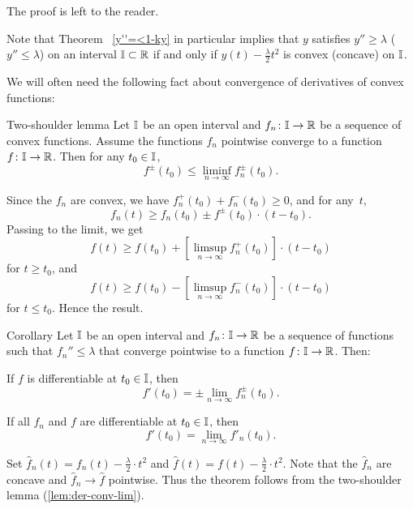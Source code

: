 The proof is left to the reader.


Note that Theorem ~\ref{y''=<1-ky} in particular implies that $y$ satisfies $y''\ge \lambda$ ( $y''\le \lambda$)  on an interval $\II\subset\RR$  if and only if $y(t)-\frac{\lambda}{2}t^2$ is convex (concave) on $\mathbb{I}$.

We will often need the following fact about convergence of derivatives of convex functions:

{\sloppy 

\begin{thm}{Two-shoulder lemma}\label{lem:der-conv-lim}
Let $\mathbb{I}$ be an open interval 
and $f_n\:\II\to\RR$ be a sequence of 
convex functions. 
Assume the functions $f_n$ pointwise converge to a function $f\:\II\to\RR$.
Then for any $t_0\in \II$,
\[f^\pm(t_0)\le \liminf_{n\to\infty}f^\pm_n(t_0).\]
\end{thm}

}

Since the $f_n$ are convex, we have $f^+_n(t_0)+f^-_n(t_0)\ge0$, and for any~$t$,
\[f_n(t)\ge f_n(t_0)\pm f^\pm(t_0)\cdot (t-t_0).\]
Passing to the limit, we get
\[f(t)\ge f(t_0)+\left[\limsup_{n\to\infty}f^+_n(t_0)\right]\cdot (t-t_0)\]
for $t\ge t_0$, and 
\[f(t)\ge f(t_0)-\left[\limsup_{n\to\infty}f^-_n(t_0)\right]\cdot (t-t_0)\]
for $t\le t_0$.
Hence the result.
\qeds

\begin{thm}{Corollary}
\label{cor:der-conv-lim}
Let $\mathbb{I}$ be an open interval 
and $f_n\:\II\to\RR$ be a sequence of functions such that $f_n''\le \lambda$ that converge pointwise to a function $f\:\II\to\RR$.
Then: 
\begin{subthm}{} If $f$ is differentiable at $t_0\in \II$, then
\[f'(t_0)=\pm\lim_{n\to\infty} f^\pm_n(t_0).\]
\end{subthm}

\begin{subthm}{} If all $f_n$ and $f$ are differentiable at $t_0\in \II$, then
\[f'(t_0)=\lim_{n\to\infty} f'_n(t_0).\]
\end{subthm}
\end{thm}

 Set $\hat f_n(t)=f_n(t)-\tfrac{\lambda}{2}\cdot t^2$ and $\hat f(t)=f(t)-\tfrac\lambda2\cdot t^2$.
Note that the $\hat f_n$ are concave and $\hat f_n\to \hat f$ pointwise.
Thus the theorem follows from the two-shoulder lemma (\ref{lem:der-conv-lim}).\qeds











